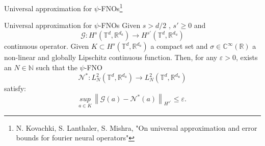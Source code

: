 \documentclass{beamer}
\newcommand{\numberset}{\mathbb}
\newcommand{\N}{\numberset{N}}
\newcommand{\R}{\numberset{R}}
\newcommand{\C}{\numberset{C}}
\begin{document}
\begin{frame}{Universal approximation for $\psi$-FNOs\footnote{N. Kovachki, S. Lanthaler, S. Mishra, "On universal approximation and error bounds for fourier neural operators"}}
	\begin{themedTitleBlock}{Universal approximation for $\psi$-FNOs} %
		Given $ s > d/2$ , $ s' \ge 0 $ and 
		\[ \mathcal{G}: H^s(\mathbb{T}^d, \R^{d_a}) \to H^{s'}(\mathbb{T}^d, \R^{d_u}) \]
		continuous operator. Given $ K \subset H^s(\mathbb{T}^d, \R^{d_a}) $ a compact set and $ \sigma \in \C^{\infty}(\R) $ a non-linear and globally Lipschitz continuous function. Then, for any $ \varepsilon > 0 $, exists an $ N \in \N $ such that the $ \psi $-FNO 
		\[ \mathcal{N}^{*}: L^2_N(\mathbb{T}^d, \R^{d_a}) \to L^2_N(\mathbb{T}^d, \R^{d_u}) \]
		satisfy:
		\[ \underset{a \in K}{sup}\, \left\| \mathcal{G}(a) - \mathcal{N}^{*}(a) \right\|_{H^{s'}} \le \varepsilon.  \]
	\end{themedTitleBlock}
\end{frame}

\end{document}

